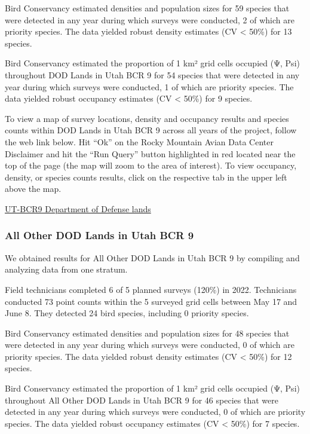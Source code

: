 \documentclass[
  letterpaper,
  DIV=11,
  numbers=noendperiod,
  oneside]{scrreprt}
\begin{document}
Bird Conservancy estimated densities and population sizes for 59 species
that were detected in any year during which surveys were conducted, 2 of
which are priority species. The data yielded robust density estimates
(CV \textless{} 50\%) for 13 species.

Bird Conservancy estimated the proportion of 1 km² grid cells occupied
(Ψ, Psi) throughout DOD Lands in Utah BCR 9 for 54 species that were
detected in any year during which surveys were conducted, 1 of which are
priority species. The data yielded robust occupancy estimates (CV
\textless{} 50\%) for 9 species.

To view a map of survey locations, density and occupancy results and
species counts within DOD Lands in Utah BCR 9 across all years of the
project, follow the web link below. Hit ``Ok'' on the Rocky Mountain
Avian Data Center Disclaimer and hit the ``Run Query'' button
highlighted in red located near the top of the page (the map will zoom
to the area of interest). To view occupancy, density, or species counts
results, click on the respective tab in the upper left above the map.

\href{http://www.rmbo.org/new_site/adc/QueryWindow.aspx\#N4IgzgrgDgpgTmALnAhoiBbEAuABCAVQBUBaAIQGEAlATlwBEYoU5EMYA7RXAewDMGMPpzAxcAGxQcAJmBABfIA=}{UT-BCR9
Department of Defense lands}

\hypertarget{all-other-dod-lands-in-utah-bcr-9}{%
\subsubsection{All Other DOD Lands in Utah BCR
9}\label{all-other-dod-lands-in-utah-bcr-9}}

We obtained results for All Other DOD Lands in Utah BCR 9 by compiling
and analyzing data from one stratum.

Field technicians completed 6 of 5 planned surveys (120\%) in 2022.
Technicians conducted 73 point counts within the 5 surveyed grid cells
between May 17 and June 8. They detected 24 bird species, including 0
priority species.

Bird Conservancy estimated densities and population sizes for 48 species
that were detected in any year during which surveys were conducted, 0 of
which are priority species. The data yielded robust density estimates
(CV \textless{} 50\%) for 12 species.

Bird Conservancy estimated the proportion of 1 km² grid cells occupied
(Ψ, Psi) throughout All Other DOD Lands in Utah BCR 9 for 46 species
that were detected in any year during which surveys were conducted, 0 of
which are priority species. The data yielded robust occupancy estimates
(CV \textless{} 50\%) for 7 species.
\end{document}
